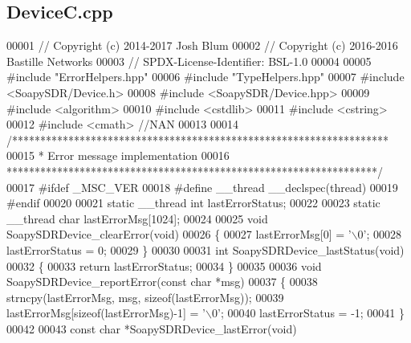 \subsection{Device\+C.\+cpp}
\label{DeviceC_8cpp_source}

\begin{DoxyCode}
00001 \textcolor{comment}{// Copyright (c) 2014-2017 Josh Blum}
00002 \textcolor{comment}{// Copyright (c) 2016-2016 Bastille Networks}
00003 \textcolor{comment}{// SPDX-License-Identifier: BSL-1.0}
00004 
00005 \textcolor{preprocessor}{#include "ErrorHelpers.hpp"}
00006 \textcolor{preprocessor}{#include "TypeHelpers.hpp"}
00007 \textcolor{preprocessor}{#include <SoapySDR/Device.h>}
00008 \textcolor{preprocessor}{#include <SoapySDR/Device.hpp>}
00009 \textcolor{preprocessor}{#include <algorithm>}
00010 \textcolor{preprocessor}{#include <cstdlib>}
00011 \textcolor{preprocessor}{#include <cstring>}
00012 \textcolor{preprocessor}{#include <cmath>} \textcolor{comment}{//NAN}
00013 
00014 \textcolor{comment}{/*******************************************************************}
00015 \textcolor{comment}{ * Error message implementation}
00016 \textcolor{comment}{ ******************************************************************/}
00017 \textcolor{preprocessor}{#ifdef \_MSC\_VER}
00018 \textcolor{preprocessor}{#define \_\_thread \_\_declspec(thread)}
00019 \textcolor{preprocessor}{#endif}
00020 
00021 \textcolor{keyword}{static} \_\_thread \textcolor{keywordtype}{int} lastErrorStatus;
00022 
00023 \textcolor{keyword}{static} \_\_thread \textcolor{keywordtype}{char} lastErrorMsg[1024];
00024 
00025 \textcolor{keywordtype}{void} SoapySDRDevice_clearError(\textcolor{keywordtype}{void})
00026 \{
00027     lastErrorMsg[0] = \textcolor{charliteral}{'\(\backslash\)0'};
00028     lastErrorStatus = 0;
00029 \}
00030 
00031 \textcolor{keywordtype}{int} SoapySDRDevice_lastStatus(\textcolor{keywordtype}{void})
00032 \{
00033     \textcolor{keywordflow}{return} lastErrorStatus;
00034 \}
00035 
00036 \textcolor{keywordtype}{void} SoapySDRDevice_reportError(\textcolor{keyword}{const} \textcolor{keywordtype}{char} *msg)
00037 \{
00038     strncpy(lastErrorMsg, msg, \textcolor{keyword}{sizeof}(lastErrorMsg));
00039     lastErrorMsg[\textcolor{keyword}{sizeof}(lastErrorMsg)-1] = \textcolor{charliteral}{'\(\backslash\)0'};
00040     lastErrorStatus = -1;
00041 \}
00042 
00043 \textcolor{keyword}{const} \textcolor{keywordtype}{char} *SoapySDRDevice_lastError(\textcolor{keywordtype}{void})

\end{DoxyCode}
